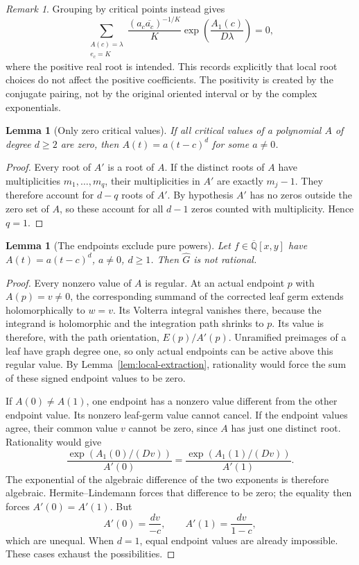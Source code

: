 \documentclass[11pt]{article}
\numberwithin{equation}{section}
\newtheorem{lemma}[theorem]{Lemma}
\theoremstyle{definition}\newtheorem{definition}[theorem]{Definition}
\theoremstyle{remark}\newtheorem{remark}[theorem]{Remark}
\newcommand{\Qb}{\overline{\mathbb Q}}
\newcommand{\HH}{\widehat G}
\begin{document}
\begin{remark}
Grouping by critical points instead gives
\[
 \sum_{\substack{A(c)=\lambda\\e_c=K}}
 \frac{(a_c\overline{a_c})^{-1/K}}{K}
 \exp\!\left(\frac{A_1(c)}{D\lambda}\right)=0,
\]
where the positive real root is intended. This records explicitly that
local root choices do not affect the positive coefficients. The
positivity is created by the conjugate pairing, not by the original
oriented interval or by the complex exponentials.
\end{remark}

\begin{lemma}[Only zero critical values]\label{lem:pure-power}
If all critical values of a polynomial $A$ of degree $d\ge2$ are zero,
then $A(t)=a(t-c)^d$ for some $a\ne0$.
\end{lemma}
\begin{proof}
Every root of $A'$ is a root of $A$. If the distinct roots of $A$ have
multiplicities $m_1,\ldots,m_q$, their multiplicities in $A'$ are
exactly $m_j-1$. They therefore account for $d-q$ roots of $A'$.
By hypothesis $A'$ has no zeros outside the zero set of $A$, so these
account for all $d-1$ zeros counted with multiplicity. Hence $q=1$.
\end{proof}

\begin{lemma}[The endpoints exclude pure powers]\label{lem:endpoints}
Let $f\in\Qb[x,y]$ have $A(t)=a(t-c)^d$, $a\ne0$, $d\ge1$.
Then $\HH$ is not rational.
\end{lemma}
\begin{proof}
Every nonzero value of $A$ is regular. At an actual endpoint $p$
with $A(p)=v\ne0$, the corresponding summand of the corrected leaf
germ extends holomorphically to $w=v$. Its Volterra integral vanishes
there, because the integrand is holomorphic and the integration path
shrinks to $p$. Its value is therefore, with the path orientation,
$E(p)/A'(p)$. Unramified preimages of a leaf have graph degree one,
so only actual endpoints can be active above this regular value.
By Lemma~\ref{lem:local-extraction}, rationality would force the sum
of these signed endpoint values to be zero.

If $A(0)\ne A(1)$, one endpoint has a nonzero value different from the
other endpoint value. Its nonzero leaf-germ value cannot cancel.
If the endpoint values agree, their common value $v$ cannot be zero,
since $A$ has just one distinct root. Rationality would give
\[
 \frac{\exp(A_1(0)/(Dv))}{A'(0)}
   =\frac{\exp(A_1(1)/(Dv))}{A'(1)}.
\]
The exponential of the algebraic difference of the two exponents is
therefore algebraic. Hermite--Lindemann forces that difference to be
zero; the equality then forces $A'(0)=A'(1)$. But
\[
 A'(0)=\frac{dv}{-c},\qquad A'(1)=\frac{dv}{1-c},
\]
which are unequal. When $d=1$, equal endpoint values are already
impossible. These cases exhaust the possibilities.
\end{proof}
\end{document}
